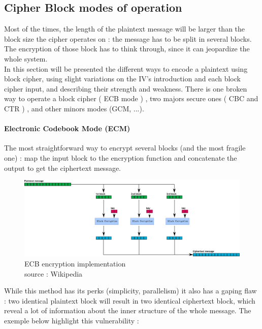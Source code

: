 \subsection{ Cipher Block modes of operation }

Most of the times, the length of the plaintext message will be larger than the block size the cipher operates on : the message has to be split in several blocks. The encryption of those block has to think through, since it can jeopardize the whole system. \\
In this section will be presented the different ways to encode a plaintext using block cipher, using slight variations on the IV's introduction and each block cipher input, and describing their strength and weakness. There is one broken way to operate a block cipher ( ECB mode ) , two majors secure ones ( CBC and CTR ) , and other minors modes (GCM, ...). \\

\paragraph{ Electronic Codebook Mode (ECM) } 

The most straightforward way to encrypt several blocks (and the most fragile one) : map the input block to the encryption function and concatenate the output to get the ciphertext message. 


\begin{figure}[h!]
    \centering
       \includegraphics[width=\textwidth]{images/ECB.png}
	\caption{ECB encryption implementation \\ source : Wikipedia}
	\label{fig:ECB_encryption_impl}
\end{figure}


While this method has its perks (simplicity, parallelism) it also has a gaping flaw : two identical plaintext block will result in two identical ciphertext block, which reveal a lot of information about the inner structure of the whole message. The exemple below highlight this vulnerability : 


